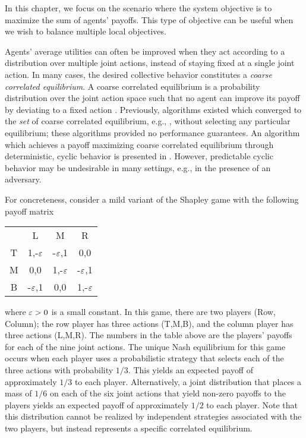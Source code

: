 
In this chapter, we focus on the scenario where the system objective is to maximize the sum of agents' payoffs. This type of objective can be useful when we wish to balance multiple local objectives. 

Agents' average utilities can often be improved when they act according to a distribution over multiple joint actions, instead of staying fixed at a single joint action.  In many cases, the desired collective behavior constitutes a {\it coarse correlated equilibrium}. A coarse correlated equilibrium is a probability distribution over the joint action space such that no agent can improve its payoff by deviating to a fixed action \cite{Aumann1987}.  Previously, algorithms existed which converged to the {\it set} of coarse correlated equilibrium, e.g., \cite{Hart2000}, without selecting any particular equilibrium; these algorithms provided no performance guarantees. An algorithm which achieves a payoff maximizing coarse correlated equilibrium through deterministic, cyclic behavior is presented in \cite{Marden2013c}. However, predictable cyclic behavior may be undesirable in many settings, e.g., in the presence of an adversary.

For concreteness, consider a mild variant of the Shapley game with the following payoff matrix
%
\begin{center}
\begin{tabular}{c|c|c|c|}
\multicolumn{1}{r}{}&
	\multicolumn{1}{c}{{L}}&
		\multicolumn{1}{c}{{M}}&
			\multicolumn{1}{c}{{R}}\\
\cline{2-4}T &1,-$\varepsilon$&-$\varepsilon$,1&0,0\\
\cline{2-4}{M}&0,0&1,-$\varepsilon$&-$\varepsilon$,1\\
\cline{2-4}{B}&-$\varepsilon$,1&0,0&1,-$\varepsilon$\\\cline{2-4}
\end{tabular}
\end{center}
%
where $\varepsilon > 0$ is a small constant.  In this game, there are two players (Row, Column); the row player has three actions (T,M,B), and the column player has three actions (L,M,R). The numbers in the table above are the players' payoffs for each of the nine joint actions.  The unique Nash equilibrium for this game occurs when each player uses a probabilistic strategy that selects each of the three actions with probability $1/3$. This yields an expected payoff of approximately $1/3$ to each player.  Alternatively,  a joint distribution that places a mass of $1/6$ on each of the six joint actions that yield non-zero payoffs to the players yields an expected payoff of approximately $1/2$ to each player. Note that this distribution cannot be realized by independent strategies associated with the two players, but instead represents a specific correlated equilibrium. 


